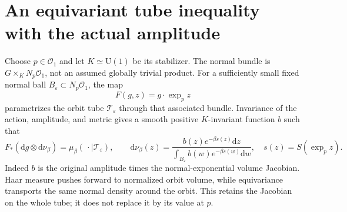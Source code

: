 \documentclass[11pt,oneside,openany]{book}
\theoremstyle{definition}
\theoremstyle{remark}
\newcommand{\dd}{\mathrm d}
\begin{document}
\section{An equivariant tube inequality with the actual amplitude}
\label{sec:actual-orbit-tube}
Choose $p\in\mathcal O_1$ and let $K\simeq\mathrm U(1)$ be its
stabilizer. The normal bundle is $G\times_KN_p\mathcal O_1$, not an
assumed globally trivial product. For a sufficiently small fixed
normal ball $B_\varepsilon\subset N_p\mathcal O_1$, the map
\[
 F(g,z)=g\cdot\exp_pz
\]
parametrizes the orbit tube $\mathcal T_\varepsilon$ through that
associated bundle. Invariance of the action, amplitude, and metric
gives a smooth positive $K$-invariant function $b$ such that
\begin{equation}\label{eq:tube-law-pushforward}
 F_*(\dd g\otimes\dd\nu_\beta)
      =\mu_\beta(\,\cdot\mid\mathcal T_\varepsilon),\qquad
 \dd\nu_\beta(z)=
 \frac{b(z)e^{-\beta s(z)}\dd z}
      {\int_{B_\varepsilon}b(w)e^{-\beta s(w)}\dd w},
 \quad s(z)=S(\exp_pz).
\end{equation}
Indeed $b$ is the original amplitude times the normal-exponential
volume Jacobian. Haar measure pushes forward to normalized orbit
volume, while equivariance transports the same normal density around
the orbit. This retains the Jacobian on the whole tube; it does not
replace it by its value at $p$.
\end{document}
